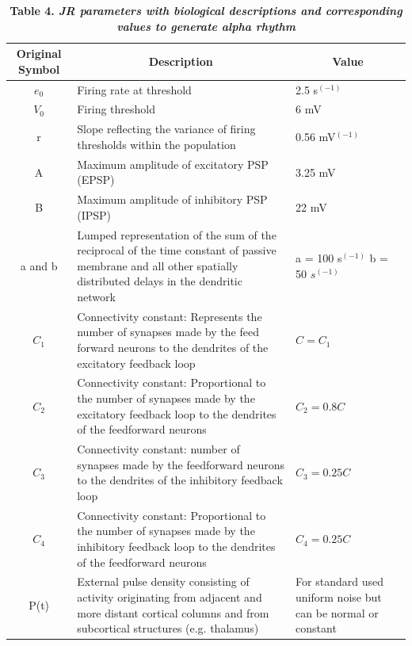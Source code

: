 \documentclass[12pt,twoside]{article}
\begin{document}
\begin{table}[H]
\centering %
\begin{tabular}{|c|p{10cm}|p{2cm}| }
\hline
Original Symbol & \multicolumn{1}{|c|}{Description} & \multicolumn{1}{c|}{Value}  \\ 
 \hline
{$e_{0}$} & Firing rate at threshold & 2.5 s$^{(-1)}$ \\ 
 \hline
 $V_{0}$ & Firing threshold	& 6 mV \\ 
 \hline
 r	& Slope reflecting the variance of firing thresholds within the population &	0.56 mV$^{(-1)}$ \\
 \hline
 A &	Maximum amplitude of excitatory PSP (EPSP)&	3.25 mV \\
 \hline
 B & Maximum amplitude of inhibitory PSP (IPSP) &22 mV \\
 \hline
 a and b &	Lumped representation of the sum of the reciprocal of the time constant of passive membrane and all other spatially distributed delays in the dendritic network	& a = 100 s$^{(-1)}$ \newline b = 50 $s^{(-1)}$\\
\hline
$C_{1}$ & Connectivity constant: Represents the number of synapses made by the feed forward neurons to the dendrites of the excitatory feedback loop &	$C=C_{1}$ \newline135\\
\hline
$C_{2}$ & Connectivity constant: Proportional to the number of synapses made by the excitatory feedback loop to the dendrites of the feedforward neurons & $C_{2}=0.8C$\\
\hline
$C_{3}$ & Connectivity constant: number of synapses made by the feedforward neurons to the dendrites of the inhibitory feedback loop & $C_{3}=0.25C$\\
\hline
$C_{4}$	& Connectivity constant: Proportional to the number of synapses made by the inhibitory feedback loop to the dendrites of the feedforward neurons & $C_{4}=0.25C$\\
\hline
P(t) & External pulse density consisting of activity originating from adjacent and more distant cortical columns and from subcortical structures (e.g. thalamus) & For standard used uniform noise but can be normal or constant\\
\hline
\end{tabular}
\caption*{\textbf{Table 4.  \textit{JR parameters with biological descriptions and corresponding values to generate alpha rhythm}}} 
\label{tab:Jansen-Rit}
\end{table}
\end{document}
